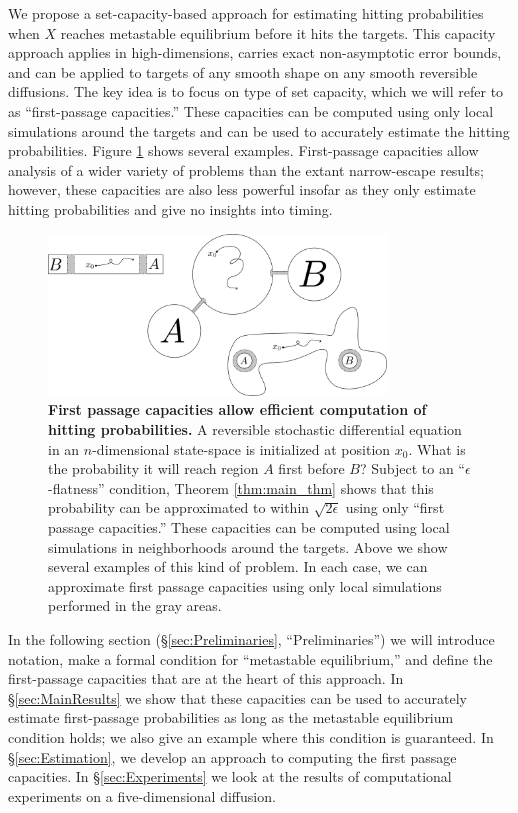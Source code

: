\documentclass[12pt, nofootinbib,english, amsmath, amssymb, aps, priprint, graphicx,floatfix]{revtex4-1}
\theoremstyle{plain}
\theoremstyle{definition}
\theoremstyle{plain}
\begin{document}
We propose a set-capacity-based approach for estimating hitting probabilities when $X$ reaches metastable equilibrium before it hits the targets.   This capacity approach applies in high-dimensions, carries exact non-asymptotic error bounds, and can be applied to targets of any smooth shape on any smooth reversible diffusions.  The key idea is to focus on type of set capacity, which we will refer to as ``first-passage capacities.''  These capacities can be computed using only local simulations around the targets and can be used to accurately estimate the hitting probabilities.  Figure \ref{fig:ToyModel} shows several examples.  First-passage capacities allow analysis of a wider variety of problems than the extant narrow-escape results; however, these capacities are also less powerful insofar as they only estimate hitting probabilities and give no insights into timing.  

\begin{figure}
    \centering  \includegraphics[width=0.8\textwidth]{bigpicture.png}
    \caption{\footnotesize\linespread{1.}\selectfont{} {\bf First passage capacities allow efficient computation of hitting probabilities.} A reversible stochastic differential equation in an $n$-dimensional state-space is initialized at position $x_0$.  What is the probability it will reach region $A$ first before $B$?  Subject to an ``$\epsilon$-flatness'' condition, Theorem \ref{thm:main_thm} shows that this probability can be approximated to within $\sqrt{2\epsilon}$ using only ``first passage capacities.'' These capacities can be computed using local simulations in neighborhoods around the targets.  Above we show several examples of this kind of problem.  In each case, we can approximate first passage capacities using only local simulations performed in the gray areas.}
\label{fig:ToyModel}
\end{figure}

In the following section (\S\ref{sec:Preliminaries}, ``Preliminaries'') we will introduce notation, make a formal condition for ``metastable equilibrium,'' and define the first-passage capacities that are at the heart of this approach.  In \S\ref{sec:MainResults} we show that these capacities can be used to accurately estimate first-passage probabilities as long as the metastable equilibrium condition holds; we also give an example where this condition is guaranteed.  In \S\ref{sec:Estimation}, we develop an approach to computing the first passage capacities.   In \S\ref{sec:Experiments} we look at the results of computational experiments on a five-dimensional diffusion.  
\end{document}
